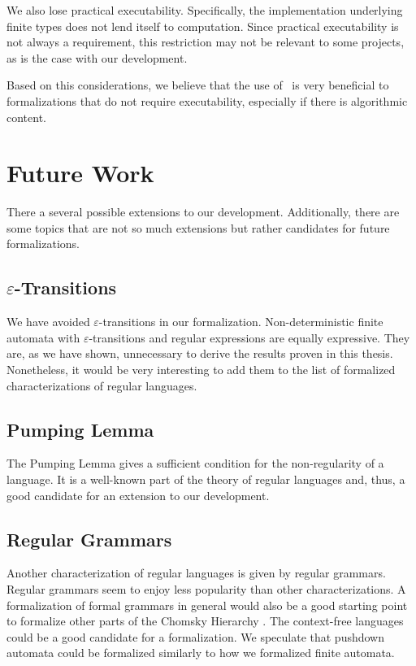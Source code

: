 We also lose practical executability. 
Specifically, the implementation underlying finite types does not lend itself to computation. 
Since practical executability is not always a requirement, this restriction may not be relevant to some projects, as is the case with our development.

Based on this considerations, we believe that the use of \ssreflect\ is very beneficial to formalizations that do not require executability, especially if there is algorithmic content. 



\section{Future Work}
There a several possible extensions to our development.
Additionally, there are some topics that are not so much extensions but rather candidates for future formalizations.


\subsection[$\varepsilon$-Transitions]{\texorpdfstring{$\varepsilon$-Transitions}{Epsilon-Transitions}}
We have avoided $\varepsilon$-transitions in our formalization. 
Non-deterministic finite automata with $\varepsilon$-transitions and regular expressions are equally expressive.
They are, as we have shown, unnecessary to derive the results proven in this thesis.
Nonetheless, it would be very interesting to add them to the list of formalized characterizations of regular languages.

\subsection{Pumping Lemma}
The Pumping Lemma \cite{BarHillelPerlesShamir61Formal} gives a sufficient condition for the non-regularity of a language. 
It is a well-known part of the theory of regular languages and, thus, a good candidate for an extension to our development.

\subsection{Regular Grammars}
Another characterization of regular languages is given by regular grammars.
Regular grammars seem to enjoy less popularity than other characterizations.
A formalization of formal grammars in general would also be a good starting point to formalize other parts of the
Chomsky Hierarchy \cite{Chomsky1956}. 
The context-free languages could be a good candidate for a formalization.
We speculate that pushdown automata could be formalized similarly to how we formalized finite automata.

